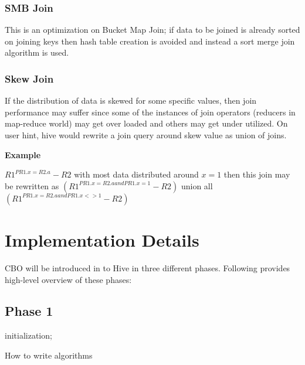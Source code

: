 \documentclass{vldb}
\begin{document}
\subsubsection*{SMB Join}
This is an optimization on Bucket Map Join; if data to be joined is already sorted on joining keys then hash table creation is avoided and instead a sort merge join algorithm is used.

\subsubsection*{Skew Join}
If the distribution of data is skewed for some specific values, then join performance may suffer since some of the instances of join operators (reducers in map-reduce world) may get over loaded and others may get under utilized. On user hint, hive would rewrite a join query around skew value as union of joins.

\noindent
\textbf{Example}

\noindent 
$R1^{PR1.x=R2.a} - R2$ with most data distributed around $x=1$ then this join may be rewritten as 
$(R1^{PR1.x=R2.a and PR1.x=1} - R2)$ union all $(R1^{PR1.x=R2.a and PR1.x<>1} - R2)$

\section{Implementation Details}
CBO will be introduced in to Hive in three different phases. Following provides high-level overview of these phases:


\subsection{Phase 1}

\begin{algorithm}[H]
\SetAlgoLined
 initialization; \\
 \caption{How to write algorithms}
\end{algorithm}
\end{document}
